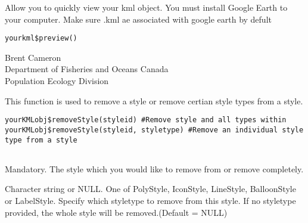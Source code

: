 \documentclass[a4paper]{book}
\begin{document}
%
\begin{Description}\relax
Allow you to quickly view your kml object. You must install Google Earth to your computer. Make sure .kml ae associated with google earth by defult
\end{Description}
%
\begin{Usage}
\begin{verbatim}
yourkml$preview()
\end{verbatim}
\end{Usage}
%
\begin{Author}\relax
Brent Cameron\\{}
Department of Fisheries and Oceans Canada\\{}
Population Ecology Division
\end{Author}
%
\begin{References}\relax
{}
\end{References}
%
\begin{Examples}
\end{Examples}
%
\begin{Description}\relax
This function is used to remove a style or remove certian style types from a style. 
\end{Description}
%
\begin{Usage}
\begin{verbatim}
yourKMLobj$removeStyle(styleid) #Remove style and all types within
yourKMLobj$removeStyle(styleid, styletype) #Remove an individual style type from a style


\end{verbatim}
\end{Usage}
%
\begin{Arguments}
\begin{ldescription}

\item[\code{styleid}] 
Mandatory. The style which you would like to remove from or remove completely.  

\item[\code{styletype}] Character string or NULL. One of PolyStyle, IconStyle, LineStyle, BalloonStyle or LabelStyle. Specify which styletype to remove from this style. If no styletype provided, the whole style will be removed.(Default = NULL) 

\end{ldescription}
\end{Arguments}
\end{document}
